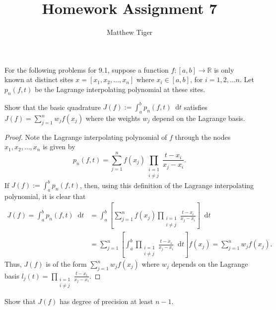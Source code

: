 \documentclass[12pt]{article}
\title{Homework Assignment 7}
\author{Matthew Tiger}
\theoremstyle{definition}
\newenvironment{custompbm}[1]
  {\renewcommand\theproblem{#1}\problem}
  {\endproblem}
\newcommand*\diff{\mathop{}\!\mathrm{d}}
\begin{document}
\maketitle


\begin{custompbm}{9.1}
  For the following problems for 9.1, suppose a function $f: [a, b] \to \mathbb{R}$ is only known at distinct sites
  $x = [x_1, x_2, \dots, x_n]$ where $x_i \in [a,b]$, for $i=1, 2, \dots n$. Let $p_n(f, t)$
  be the Lagrange interpolating polynomial at these sites.
\end{custompbm}

\begin{custompbm}{9.1.1}
  Show that the basic quadrature $J(f) := \int_a^b p_n(f, t) \diff{t}$ satisfies
  $J(f) = \sum_{j=1}^n w_j f(x_j)$ where the weights $w_j$ depend on the Lagrange basis.
\end{custompbm}

\begin{proof}
  Note the Lagrange interpolating polynomial of $f$ through the nodes
  $x_1, x_2, \dots, x_n$ is given by
  \[
    p_n(f, t) = \sum_{j=1}^{n} f(x_j) \prod_{\substack{i=1\\i\neq j}} \frac{t - x_i}{x_j - x_i}.
  \]
  If $J(f) := \int_a^b p_n(f, t)$, then, using this definition of the Lagrange interpolating
  polynomial, it is clear that
  \begin{align*}
    J(f) = \int_a^b p_n(f, t) \diff{t}
    &= \int_a^b \left[\sum_{j=1}^{n} f(x_j) \prod_{\substack{i=1\\i\neq j}} \frac{t - x_i}{x_j - x_i}\right] \diff{t}\\
    &= \sum_{j=1}^{n} \left[\int_a^b \prod_{\substack{i=1\\i\neq j}} \frac{t - x_i}{x_j - x_i} \diff{t} \right] f(x_j) = \sum_{j=1}^{n} w_j f(x_j).
  \end{align*}
  Thus, $J(f)$ is of the form $\sum_{j=1}^{n} w_j f(x_j)$ where $w_j$ depends on
  the Lagrange basis $l_j(t) = \prod_{\substack{i=1\\i\neq j}} \frac{t - x_i}{x_j - x_i}$.
\end{proof}


\begin{custompbm}{9.1.2}
  Show that $J(f)$ has degree of precision at least $n-1$.
\end{custompbm}
\end{document}
